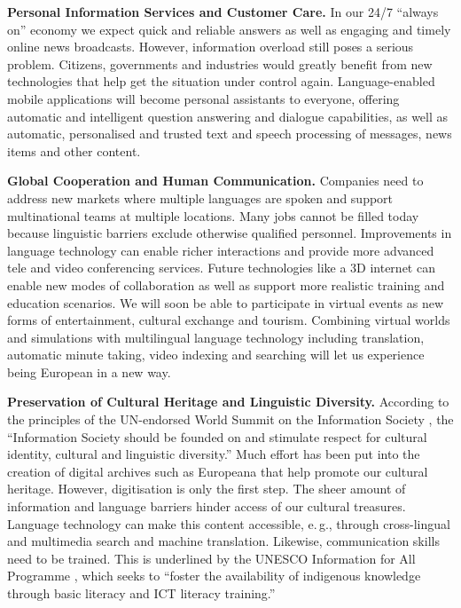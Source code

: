 \documentclass[10pt, plain]{../../metanetpaper}
\begin{document}
\begin{multicols}{2}
\textbf{Personal Information Services and Customer Care.} In our 24/7 ``always on'' economy we expect quick and reliable answers as well as engaging and timely online news broadcasts. However, information overload still poses a serious problem. Citizens, governments and industries would greatly benefit from new technologies that help get the situation under control again. Language-enabled mobile applications will become personal assistants to everyone, offering automatic and intelligent question answering and dialogue capabilities, as well as automatic, personalised and trusted text and speech processing of messages, news items and other content.

\textbf{Global Cooperation and Human Communication.} Companies need to address new markets where multiple languages are spoken and support multinational teams at multiple locations. Many jobs cannot be filled today because linguistic barriers exclude otherwise qualified personnel. Improvements in language technology can enable richer interactions and provide more advanced tele and video conferencing services. Future technologies like a 3D internet can enable new modes of collaboration as well as support more realistic training and education scenarios. We will soon be able to participate in virtual events as new forms of entertainment, cultural exchange and tourism. Combining virtual worlds and simulations with multilingual language technology including translation, automatic minute taking, video indexing and searching will let us experience being European in a new way.

\textbf{Preservation of Cultural Heritage and Linguistic Diversity.} According to the principles of the UN-endorsed World Summit on the Information Society \cite{worldsummit2003}, the “Information Society should be founded on and stimulate respect for cultural identity, cultural and linguistic diversity.” Much effort has been put into the creation of digital archives such as Europeana that help promote our cultural heritage. However, digitisation is only the first step. The sheer amount of information and language barriers hinder access of our cultural treasures. Language technology can make this content accessible, e.\,g., through cross-lingual and multimedia search and machine translation. Likewise, communication skills need to be trained. This is underlined by the UNESCO Information for All Programme \cite{Unesco2}, which seeks to “foster the availability of indigenous knowledge through basic literacy and ICT literacy training.”


\end{multicols}
\end{document}

